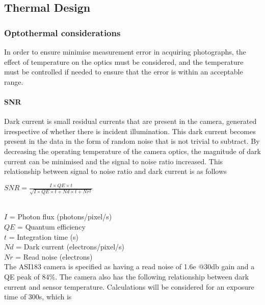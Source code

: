 \pagebreak
\subsection{Thermal Design} \label{Thermal_section}
\subsubsection{Optothermal considerations}

In order to ensure minimise measurement error in acquiring photographs, the effect of temperature on the optics must be considered, and the temperature must be controlled if needed to ensure that the error is within an acceptable range.\

\paragraph{SNR}

Dark current is small residual currents that are present in the camera, generated irrespective of whether there is incident illumination. This dark current becomes present in the data in the form of random noise that is not trivial to subtract. By decreasing the operating temperature of the camera optics, the magnitude of dark current can be minimised and the signal to noise ratio increased. This relationship between signal to noise ratio and dark current is as follows\\

\begin{center}
 $SNR =  \frac{I\times QE\times t}{\sqrt{I\times QE\times t+Nd\times t+Nr^2}}$\\
\end{center}

\\
 
$I$ = Photon flux (photons/pixel/s)\\
$QE$ = Quantum efficiency\\
$t$ = Integration time (s)\\
$Nd$ = Dark current (electrons/pixel/s)\\
$Nr$ = Read noise (electrons)\\

The ASI183 camera is specified as having a read noise of 1.6e @30db gain and a QE peak of 84\%. The camera also has the following relationship between dark current and sensor temperature. Calculations will be considered for an exposure time of 300s, which is  \\


